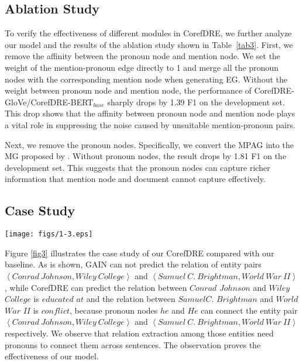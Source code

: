 \documentclass{article}
\begin{document}
\subsection{Ablation Study}

To verify the effectiveness of different modules in CorefDRE, we further analyze our model and the results of the ablation study shown in Table~\ref{tab3}.
First, we remove the affinity between the pronoun node and mention node. We set the weight of the mention-pronoun edge directly to 1 and merge all the pronoun nodes with the corresponding mention node when generating EG. Without the weight between pronoun node and mention node, the performance of CorefDRE-GloVe/CorefDRE-BERT$_{base}$ sharply drops by 1.39 F1 on the development set. This drop shows that the affinity between pronoun node and mention node plays a vital role in suppressing the noise caused by unsuitable mention-pronoun pairs.

Next, we remove the pronoun nodes. Specifically, we convert the MPAG into the MG proposed by \cite{zeng2020double}. Without pronoun nodes, the result drops by 1.81 F1 on the development set. This suggests that the pronoun nodes can capture richer information that mention node and document cannot capture effectively. 

\subsection{Case Study}
\begin{figure*}[ht]
    \centering
    \setlength{\abovecaptionskip}{0.4cm}
    \setlength{\belowcaptionskip}{-0.4cm}
    \vspace{-0.8cm}
    \texttt{[image: figs/1-3.eps]}
    \caption{Case Study on our CorefDRE model and baseline model. The graph indicates our model based on MPAG can extract the relations while other models, GAIN, have not the inference.}
    \label{fig3}
\end{figure*}
Figure \ref{fig3} illustrates the case study of our CorefDRE compared with our baseline. As is shown, GAIN can not predict the relation of entity pairs $\left<Conrad~Johnson, Wiley~College\right>$ and $\left<Samuel~C.~Brightman, World~War~II\right>$, while CorefDRE can predict the relation between $Conrad$ $Johnson$ and $Wiley$ $College$ is $educated$ $at$ and the relation between $Samuel C.$ $Brightman$ and $World$ $War$ $II$ is $conflict$, because pronoun nodes $he$ and $He$ can connect the entity pair $\left<Conrad~Johnson,Wiley~College\right>$ and $\left<Samuel~C.~Brightman, World~War~II\right>$ respectively. We observe that relation extraction among those entities need pronouns to connect them across sentences. The observation proves the effectiveness of our model.
\end{document}
